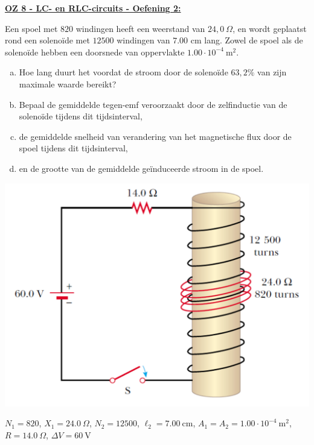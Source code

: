 \textbf{\underline{OZ 8 - LC- en  RLC-circuits - Oefening 2:}}
\vspace{0.5cm}

Een spoel met $820$ windingen heeft een weerstand van $24,0 \ \Omega$, en wordt geplaatst rond een solenoïde met $12500$ windingen van $7.00$ cm lang. Zowel de spoel als de solenoïde hebben een doorsnede van oppervlakte $1.00\cdot10^{-4} \ \text{m}^2$.

\vspace{0.3cm}
\begin{minipage}{.66\textwidth}
    \begin{enumerate}[(a)]
        \item 
            Hoe lang duurt het voordat de stroom door de solenoïde $63,2\%$ van zijn maximale waarde bereikt?
        \item 
            Bepaal de gemiddelde tegen-emf veroorzaakt door de zelfinductie van de solenoïde tijdens dit tijdsinterval,
        \item 
            de gemiddelde snelheid van verandering van het magnetische flux door de spoel tijdens dit tijdsinterval,
        \item 
            en de grootte van de gemiddelde geïnduceerde stroom in de spoel.
    \end{enumerate}
\end{minipage}
\begin{minipage}{.3\textwidth}
    \includegraphics[scale = 0.3]{oz08/resources/Oz8Oef2.png}
\end{minipage}

\begin{description}[labelwidth=1.5cm, leftmargin=!]
    \item[Geg. :]   $N_1 = 820$, $X_1 = 24.0 \ \Omega$, $N_2 = 12500$, $\ell_2 = 7.00 \ \text{cm}$, $A_1 = A_2 = 1.00\cdot10^{-4} \ \text{m}^2$, $R = 14.0 \ \Omega$, $\Delta V = 60 \ \text{V}$
\end{description}

